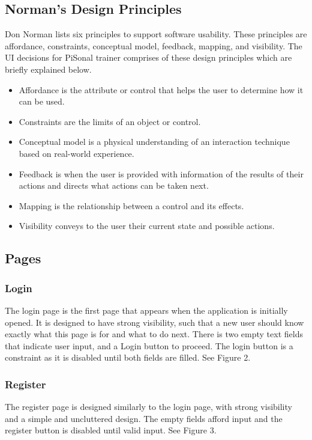 \documentclass{article}
\begin{document}
\subsection{Norman’s Design Principles}
Don Norman lists six principles to support software usability. These principles are affordance, constraints, conceptual model, feedback, mapping, and visibility\cite{norman}. The UI decisions for PiSonal trainer comprises of these design principles which are briefly explained below. 
\begin{itemize}
    \item Affordance is the attribute or control that helps the user to determine how it can be used\cite{norman}.
    \item Constraints are the limits of an object or control\cite{norman}.
    \item Conceptual model is a physical understanding of an interaction technique based on real-world experience\cite{norman}. 
    \item Feedback is when the user is provided with information of the results of their actions and directs what actions can be taken next\cite{norman}.   
    \item Mapping is the relationship between a control and its effects\cite{norman}.
    \item Visibility conveys to the user their current state and possible actions\cite{norman}.
\end{itemize}

\subsection{Pages}
\subsubsection{Login}
The login page is the first page that appears when the application is initially opened. It is designed to have strong visibility, such that a new user should know exactly what this page is for and what to do next. There is two empty text fields that indicate user input, and a Login button to proceed. The login button is a constraint as it is disabled until both fields are filled. See Figure 2.

\subsubsection{Register}
The register page is designed similarly to the login page, with strong visibility and a simple and uncluttered design. The empty fields afford input and the register button is disabled until valid input. See Figure 3.
\end{document}
